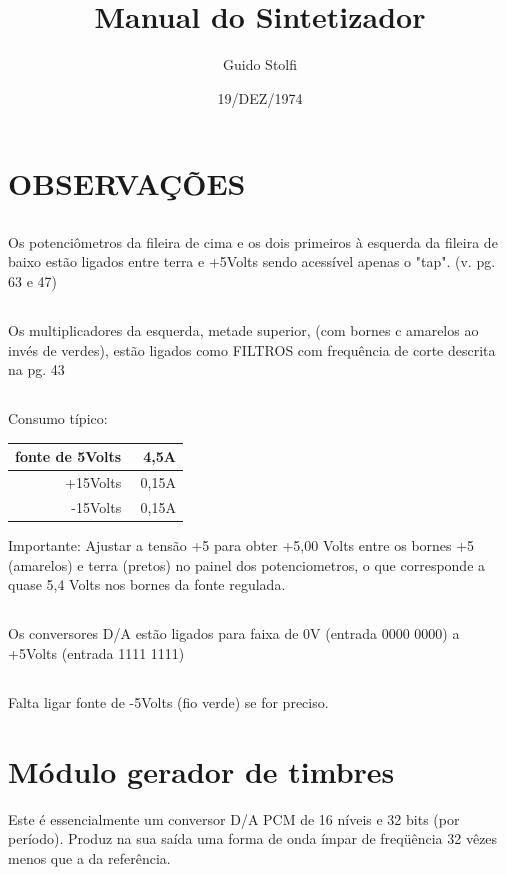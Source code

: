 \documentclass{article}
\title{Manual do Sintetizador}
\author{Guido Stolfi}
\date{19/DEZ/1974}
\begin{document}
\maketitle

\section{OBSERVAÇÕES}
\subsection{}
Os potenciômetros da fileira de cima e os dois primeiros à esquerda da fileira de baixo estão ligados entre terra e +5Volts sendo acessível apenas o "tap". (v. pg. 63 e 47)

\subsection{}
Os multiplicadores da esquerda, metade superior, (com bornes c amarelos ao invés de verdes), estão ligados como FILTROS com frequência de corte descrita na pg. 43

\subsection{}
Consumo típico:

\begin{tabular}{r|r}
fonte de 5Volts & ~4,5A \\
\hline
+15Volts & 0,15A \\
\hline
-15Volts & 0,15A \\
\end{tabular}

Importante: Ajustar a tensão +5 para obter +5,00 Volts entre os bornes +5 (amarelos) e terra (pretos) no painel dos potenciometros, o que corresponde a quase 5,4 Volts nos bornes da fonte regulada.

\subsection{}
Os conversores D/A estão ligados para faixa de 0V (entrada 0000 0000) a +5Volts (entrada 1111 1111)

\subsection{}
Falta ligar fonte de -5Volts (fio verde) se for preciso.


\section{Módulo gerador de timbres}
Este é essencialmente um conversor D/A PCM de 16 níveis e 32 bits (por período). Produz na sua saída uma forma de onda ímpar de freqüência 32 vêzes menos que a da referência.
\end{document}
